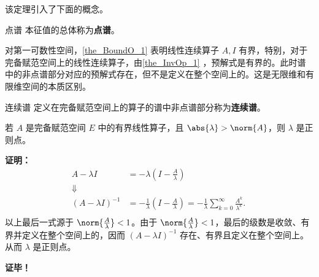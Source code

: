 该定理引入了下面的概念。
\begin{definition}{点谱}
本征值的总体称为\textbf{点谱}。
\end{definition}

对第一可数性空间，\autoref{the_BoundO_1} 表明线性连续算子 $A,I$ 有界，特别，对于完备赋范空间上的线性连续算子，由\autoref{the_InvOp_1} ，预解式是有界的。此时谱中的非点谱部分对应的预解式存在，但不是定义在整个空间上的。这是无限维和有限维空间的本质区别。

\begin{definition}{连续谱}
定义在完备赋范空间上的算子的谱中非点谱部分称为\textbf{连续谱}。
\end{definition}



\begin{theorem}{}
若 $A$ 是完备赋范空间 $E$ 中的有界线性算子，且 $\abs{\lambda}>\norm{A}$，则 $\lambda$ 是正则点。
\end{theorem}

\textbf{证明：} 
\begin{equation}
\begin{aligned}
A-\lambda I&=-\lambda(I-\frac{A}{\lambda})\\
\Downarrow\\
(A-\lambda I)^{-1}&=-\frac{1}{\lambda}(I-\frac{A}{\lambda})=-\frac{1}{\lambda}\sum_{k=0}^\infty\frac{A^k}{\lambda^k}.\\
\end{aligned}~
\end{equation}
以上最后一式源于 $\norm{\frac{A}{\lambda}}<1$。由于 $\norm{\frac{A}{\lambda}}<1$，最后的级数是收敛、有界并定义在整个空间上的，因而 $(A-\lambda I)^{-1}$ 存在、有界且定义在整个空间上。从而 $\lambda$ 是正则点。


\textbf{证毕！}